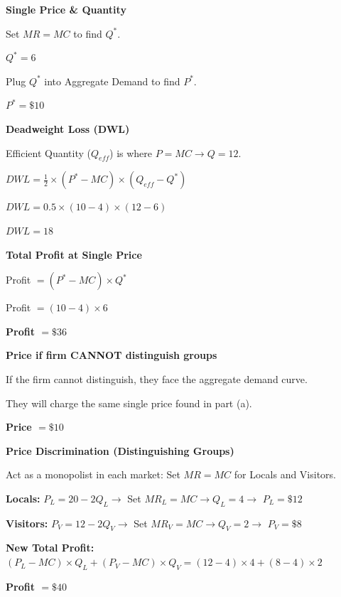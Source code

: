 \documentclass[12pt]{article}
\begin{document}
\begin{subqs}

\item \textbf{Single Price \& Quantity}
  \begin{solbullets}
    \item Set $MR = MC$ to find $Q^*$.
    \item \textbf{$Q^* = 6$}
    \item Plug $Q^*$ into Aggregate Demand to find $P^*$.
    \item \textbf{$P^* = \$10$}
  \end{solbullets}

\item \textbf{Deadweight Loss (DWL)}
  \begin{solbullets}
    \item Efficient Quantity ($Q_{eff}$) is where $P = MC \rightarrow Q = 12$.
    \item $DWL = \frac{1}{2} \times (P^* - MC) \times (Q_{eff} - Q^*)$
    \item $DWL = 0.5 \times (10 - 4) \times (12 - 6)$
    \item \textbf{$DWL = 18$}
  \end{solbullets}

\item \textbf{Total Profit at Single Price}
  \begin{solbullets}
    \item Profit $= (P^* - MC) \times Q^*$
    \item Profit $= (10 - 4) \times 6$
    \item \textbf{Profit $= \$36$}
  \end{solbullets}

\item \textbf{Price if firm CANNOT distinguish groups}
  \begin{solbullets}
    \item If the firm cannot distinguish, they face the aggregate demand curve.
    \item They will charge the same single price found in part (a).
    \item \textbf{Price $= \$10$}
  \end{solbullets}

\item \textbf{Price Discrimination (Distinguishing Groups)}
  \begin{solbullets}
    \item Act as a monopolist in each market: Set $MR = MC$ for Locals and Visitors.
    \item \textbf{Locals:} $P_L = 20 - 2Q_L \rightarrow$ Set $MR_L = MC \rightarrow Q_L = 4 \rightarrow$ \textbf{$P_L = \$12$}
    \item \textbf{Visitors:} $P_V = 12 - 2Q_V \rightarrow$ Set $MR_V = MC \rightarrow Q_V = 2 \rightarrow$ \textbf{$P_V = \$8$}
    \item \textbf{New Total Profit:} $(P_L - MC) \times Q_L + (P_V - MC) \times Q_V = (12 - 4) \times 4 + (8 - 4) \times 2$
    \item \textbf{Profit $= \$40$}
  \end{solbullets}


\end{subqs}
\end{document}
